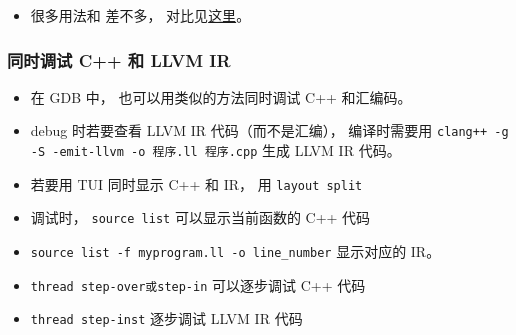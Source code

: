 
\begin{issues}
\issueDraft
\end{issues}


\begin{itemize}
\item 很多用法和  差不多， 对比见\href{https://lldb.llvm.org/use/map.html}{这里}。
\end{itemize}

\subsubsection{同时调试 C++ 和 LLVM IR}
\begin{itemize}
\item 在 GDB 中， 也可以用类似的方法同时调试 C++ 和汇编码。
\item debug 时若要查看 LLVM IR 代码（而不是汇编）， 编译时需要用 \verb|clang++ -g -S -emit-llvm -o 程序.ll 程序.cpp| 生成 LLVM IR 代码。
\item 若要用 TUI 同时显示 C++ 和 IR， 用 \verb|layout split|
\item 调试时， \verb|source list| 可以显示当前函数的 C++ 代码
\item \verb|source list -f myprogram.ll -o line_number| 显示对应的 IR。
\item \verb|thread step-over或step-in| 可以逐步调试 C++ 代码
\item \verb|thread step-inst| 逐步调试 LLVM IR 代码
\end{itemize}
